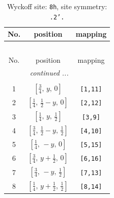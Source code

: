 \documentclass[fleqn,8pt]{jsarticle}
\begin{document}
\begin{longtable}{ccc}
\caption{Wyckoff site: {\tt 8h}, site symmetry: {\tt .2'.}}
 \\
 \hline \hline
No. & position & mapping \\ \hline \endfirsthead

\multicolumn{2}{l}{\tablename\ \thetable{}} \\
 \hline \hline
No. & position & mapping \\ \hline \endhead

 \hline \hline
\multicolumn{2}{r}{\footnotesize\it continued ...} \\ \endfoot

 \hline \hline
\multicolumn{2}{r}{} \\ \endlastfoot

1 & $\left[ \frac{3}{4},\, y,\, 0 \right]$ & {\tt [1,11]} \\ \hline
2 & $\left[ \frac{1}{4},\, \frac{1}{2} - y,\, 0 \right]$ & {\tt [2,12]} \\ \hline
3 & $\left[ \frac{1}{4},\, y,\, \frac{1}{2} \right]$ & {\tt [3,9]} \\ \hline
4 & $\left[ \frac{3}{4},\, \frac{1}{2} - y,\, \frac{1}{2} \right]$ & {\tt [4,10]} \\ \hline
5 & $\left[ \frac{1}{4},\, - y,\, 0 \right]$ & {\tt [5,15]} \\ \hline
6 & $\left[ \frac{3}{4},\, y + \frac{1}{2},\, 0 \right]$ & {\tt [6,16]} \\ \hline
7 & $\left[ \frac{3}{4},\, - y,\, \frac{1}{2} \right]$ & {\tt [7,13]} \\ \hline
8 & $\left[ \frac{1}{4},\, y + \frac{1}{2},\, \frac{1}{2} \right]$ & {\tt [8,14]} \\
\end{longtable}
\renewcommand{\arraystretch}{1.2}
\end{document}
